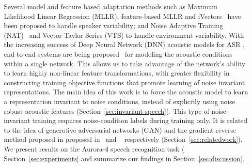 \documentclass{article}
\begin{document}
    Several model and feature based adaptation methods such as Maximum Likelihood Linear Regression (MLLR),  feature-based MLLR and iVectors~\cite{ivec} have been proposed to handle speaker variability; and Noise Adaptive Training (NAT)~\cite{msftnoise}  and Vector Taylor Series (VTS) to handle environment variability. With the increasing success of Deep Neural Network (DNN) acoustic models for ASR \cite{hinton2012deep, msft, ibm}, end-to-end systems are being proposed~\cite{essen, scatterTransforms, fromaudio} for modeling the acoustic conditions within a single network. This allows us to take advantage of the network's ability to learn highly non-linear feature transformations, with greater flexibility in constructing training objective functions that promote learning of noise invariant representations. The main idea of this work is to force the acoustic model to learn a representation invariant to noise conditions, instead of explicitly using noise robust acoustic features (Section~\ref{sec:invariant-speech}). This type of noise-invariant training requires noise-condition labels during training only. It is related to the idea of generative adversarial networks (GAN) and the gradient reverse method proposed in proposed  in~\cite{goodfellow2014generative}  and ~\cite{ganin2014unsupervised} respectively (Section~\ref{sec:relatedwork}). We present results on the Aurora-4 speech recognition task ( Section~\ref{sec:experiments} and summarize our findings in Section~\ref{sec:discussion}.
    
\end{document}
